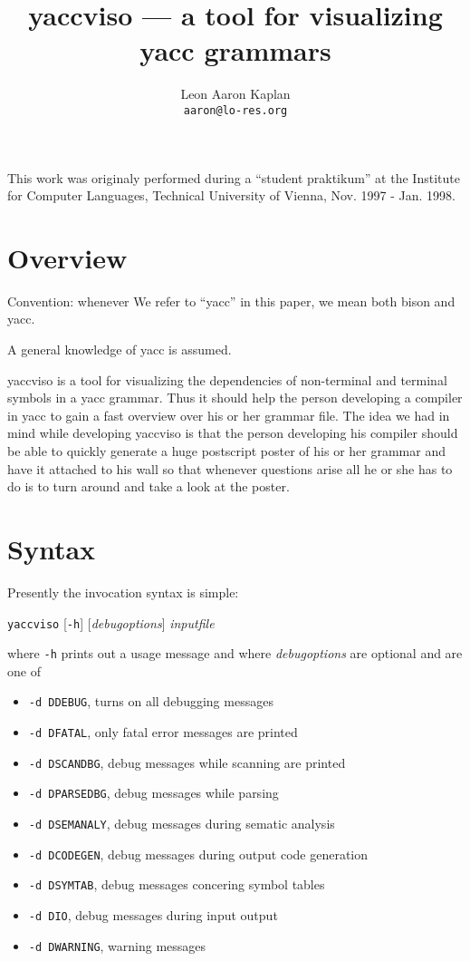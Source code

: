 \documentclass[a4paper,twocolumn]{article}
\title{yaccviso --- a tool for visualizing yacc grammars}
\author{Leon Aaron Kaplan\\{\tt aaron@lo-res.org}}
\begin{document}
\maketitle

	This work was originaly performed during a ``student praktikum'' at the
	Institute for Computer Languages, Technical University of Vienna,
	Nov. 1997 - Jan. 1998. 


\tableofcontents

\section{Overview}

Convention: whenever We refer to ``yacc'' in this paper, we mean both bison 
	and yacc.

A general knowledge of yacc is assumed.

yaccviso is a tool for visualizing the dependencies of non-terminal and
terminal symbols in a yacc grammar. Thus it should help the person
developing a compiler in yacc to gain a fast overview over his or her grammar
file. The idea we had in mind while developing yaccviso is that the 
person developing his compiler should be able to quickly generate a huge
postscript poster of his or her grammar and have it attached to his wall
so that whenever questions arise all he or she has to do is to turn around
and take a look at the poster.


\section{Syntax}

Presently the invocation syntax is simple:

{\tt yaccviso} [{\tt -h}] [{\sl debugoptions}] {\sl inputfile}

where {\tt -h} prints out a usage message and where {\sl debugoptions} 
are optional and are one of 
\begin{itemize}
	\item {\tt -d DDEBUG}, turns on all debugging messages
	\item {\tt -d DFATAL}, only fatal error messages are printed
	\item {\tt -d DSCANDBG}, debug messages while scanning are printed
	\item {\tt -d DPARSEDBG}, debug messages while parsing
	\item {\tt -d DSEMANALY}, debug messages during sematic analysis
	\item {\tt -d DCODEGEN}, debug messages during output code generation
	\item {\tt -d DSYMTAB}, debug messages concering symbol tables
	\item {\tt -d DIO}, debug messages during input output
	\item {\tt -d DWARNING}, warning messages
\end{itemize}
\end{document}
